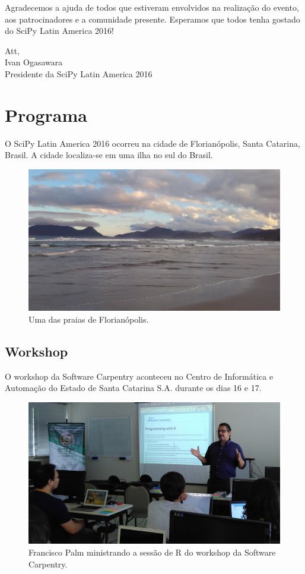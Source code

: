 \documentclass[12pt]{article}
\begin{document}
Agradecemos a ajuda de todos que estiveram envolvidos na realização do evento, aos patrocinadores e a comunidade presente. Esperamos que todos tenha gostado do SciPy Latin America 2016!


Att, \\
\indent Ivan Ogasawara \\
\indent Presidente da SciPy Latin America 2016


\clearpage
\newpage

\section*{Programa}

O SciPy Latin America 2016 ocorreu na cidade de Florianópolis, Santa Catarina,
Brasil. A cidade localiza-se em uma ilha no sul do Brasil.

\begin{figure}[!htb]
\center
\includegraphics[height=.3\textheight]{venue-beach.jpg}
\caption{Uma das praias de Florianópolis.}
\end{figure}

\subsection*{Workshop}

O workshop da Software Carpentry aconteceu no Centro de Informática e Automação
do Estado de Santa Catarina S.A. durante os dias 16 e 17.

\begin{figure}[!htb]
\center
\includegraphics[height=.3\textheight]{swc-francisco.jpg}
\caption{Francisco Palm ministrando a sessão de R do workshop da Software
Carpentry.}
\end{figure}
\end{document}
